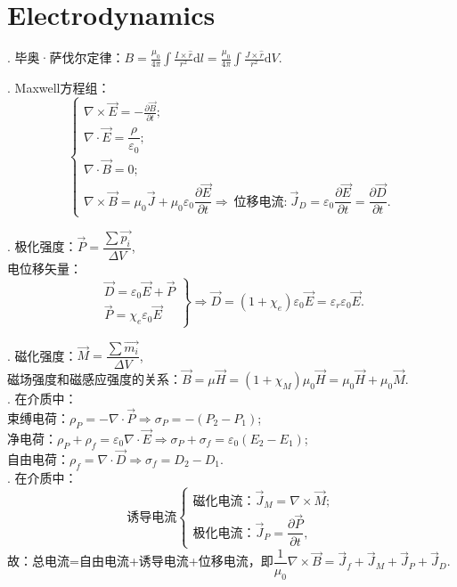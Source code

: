 \documentclass[12pt, 
]{article}
\begin{document}
\newpage
\section{Electrodynamics}
. 毕奥·萨伐尔定律：$\displaystyle B=\frac{\mu_0}{4\pi}\int\frac{I\times\hat{r}}{r^2}\mathrm{d}l=\frac{\mu_0}{4\pi}\int\frac{J\times\hat{r}}{r^2}\mathrm{d}V$.
~\\

. Maxwell方程组：
\[
	\left\{
	\begin{array}{l}
		\displaystyle\nabla\times\vec{E}=-\frac{\partial\vec{B}}{\partial t}; \\
		\nabla\cdot\vec{E}=\dfrac{\rho}{\varepsilon_0};\\
		\nabla\cdot\vec{B}=0;\\
		\nabla\times\vec{B}=\mu_0\vec{J}+\mu_0\varepsilon_0\dfrac{\partial\vec{E}}{\partial t}\Rightarrow~\text{位移电流:}~\vec{J}_D=\varepsilon_0\dfrac{\partial\vec{E}}{\partial t}=\dfrac{\partial\vec{D}}{\partial t}.
	\end{array}
	\right.
\]

. 极化强度：$\vec{P}=\dfrac{\sum\vec{p_i}}{\Delta V}$,
~\\\phantom{~~~~}电位移矢量：
\[
	\left.
	\begin{array}{l}
		\vec{D}=\varepsilon_0\vec{E}+\vec{P}\\
		\vec{P}=\chi_e\varepsilon_0\vec{E}
	\end{array}
	\right\}\Rightarrow
\vec{D}=(1+\chi_e)\varepsilon_0\vec{E}=\varepsilon_r\varepsilon_0\vec{E}.
\]

. 磁化强度：$\vec{M}=\dfrac{\sum \vec{m_i}}{\Delta V}$,
~\\\phantom{~~~~}磁场强度和磁感应强度的关系：$\vec{B}=\mu\vec{H}=(1+\chi_M)\mu_0\vec{H}=\mu_0\vec{H}+\mu_0\vec{M}$.
~\\

. 在介质中：
~\\\phantom{~~~~~~}束缚电荷：$\rho_P=-\nabla\cdot\vec{P}\Rightarrow\sigma_P=-(P_2-P_1)$;
~\\\phantom{~~~~~~}净电荷：$\rho_P+\rho_f=\varepsilon_0\nabla\cdot\vec{E}\Rightarrow\sigma_P+\sigma_f=\varepsilon_0(E_2-E_1)$;
~\\\phantom{~~~~~~}自由电荷：$\rho_f=\nabla\cdot\vec{D}\Rightarrow\sigma_f=D_2-D_1$.
~\\

. 在介质中：
\[
	\text{诱导电流}\left\{
	\begin{array}{l}
		\text{磁化电流：}\vec{J}_M=\nabla\times\vec{M};\\
		\text{极化电流：}\vec{J}_P=\dfrac{\partial\vec{P}}{\partial t},
	\end{array}
	\right.
\]
\phantom{~~~~}故：总电流=自由电流+诱导电流+位移电流，即$\dfrac{1}{\mu_0}\nabla\times\vec{B}=\vec{J}_f+\vec{J}_M+\vec{J}_P+\vec{J}_D$.
~\\
\end{document}
